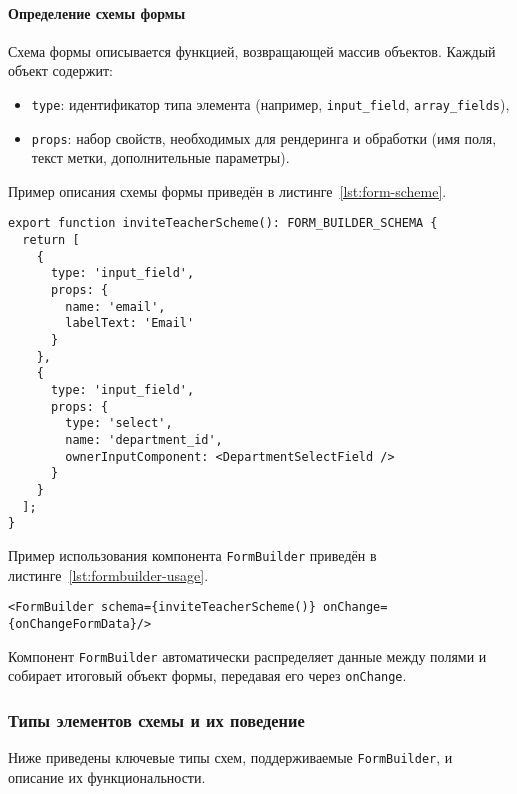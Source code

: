\paragraph{Определение схемы формы}
Схема формы описывается функцией, возвращающей массив объектов. Каждый объект содержит:
\begin{itemize}
  \item \texttt{type}: идентификатор типа элемента (например, \texttt{input\_field}, \texttt{array\_fields}),
  \item \texttt{props}: набор свойств, необходимых для рендеринга и обработки (имя поля, текст метки, дополнительные параметры).
\end{itemize}

Пример описания схемы формы приведён в листинге~\ref{lst:form-scheme}.

\begin{lstlisting}[caption=Пример описания схемы формы,label=lst:form-scheme]
export function inviteTeacherScheme(): FORM_BUILDER_SCHEMA {
  return [
    {
      type: 'input_field',
      props: {
        name: 'email',
        labelText: 'Email'
      }
    },
    {
      type: 'input_field',
      props: {
        type: 'select',
        name: 'department_id',
        ownerInputComponent: <DepartmentSelectField />
      }
    }
  ];
}
\end{lstlisting}

Пример использования компонента \texttt{FormBuilder} приведён в листинге~\ref{lst:formbuilder-usage}.

\begin{lstlisting}[caption=Использование \texttt{FormBuilder},label=lst:formbuilder-usage]
<FormBuilder schema={inviteTeacherScheme()} onChange={onChangeFormData}/>
\end{lstlisting}

Компонент \texttt{FormBuilder} автоматически распределяет данные между полями и собирает итоговый объект формы, передавая его через \texttt{onChange}.

\subsubsection{Типы элементов схемы и их поведение}
Ниже приведены ключевые типы схем, поддерживаемые \texttt{FormBuilder}, и описание их функциональности.

